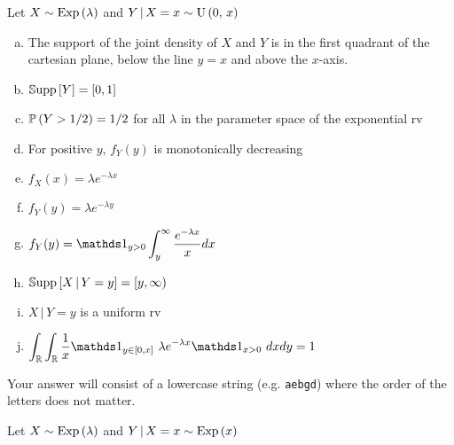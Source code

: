 \documentclass[12pt,landscape]{article}
\newcommand{\instr}{\small Your answer will consist of a lowercase string (e.g. \texttt{aebgd}) where the order of the letters does not matter. \normalsize}
\begin{document}
\problem{} Let $X \sim \mathrm{Exp}\left(\lambda\right)$ and $Y\,|\,X = x \sim \mathrm{U}\left(0,\,x\right)$

\vspace{-0.2cm}\benum{} 

\begin{enumerate}[(a)]
\item The support of the joint density of $X$ and $Y$ is in the first quadrant of the cartesian plane, below the line $y=x$ and above the $x$-axis.
\item $\mathbb{S}\text{upp}\left[Y\right] = [0,1]$
\item $\mathbb{P}\left(Y > 1/2\right) = 1/2$ for all $\lambda$ in the parameter space of the exponential rv
\item For positive $y$, $f_Y(y)$ is monotonically decreasing
\item $f_X(x) = \lambda e^{-\lambda x}$
\item $f_Y(y) = \lambda e^{-\lambda y}$

\item $f_Y(y) = \indic{y > 0} \displaystyle\int_y^\infty \displaystyle \frac{e^{-\lambda x}}{x} dx$

\item $\mathbb{S}\text{upp}\left[X\,|\,Y=y\right] = [y, \infty)$
\item $X\,|\,Y=y$ is a uniform rv

\item $\displaystyle\int_\reals \displaystyle\int_\reals \displaystyle\oneover{x} \indic{y \in [0, x]} ~\lambda e^{-\lambda x} \indic{x > 0} ~dx dy = 1$ 
\end{enumerate}
\eenum\instr\pagebreak


\problem{} Let $X \sim \mathrm{Exp}\left(\lambda\right)$ and $Y\,|\,X  = x \sim \mathrm{Exp}\left(x\right)$

\vspace{-0.2cm}\benum{} 
\end{document}
